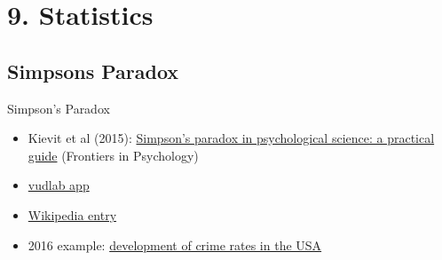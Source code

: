 \documentclass[xcolor=table,       handout,    xcolor=dvipsnames]{beamer}\usepackage[]{graphicx}\usepackage[]{color}
\begin{document}
\section{9. Statistics}

\subsection{Simpsons Paradox}

\begin{frame}{Simpson's Paradox}
\begin{itemize}
\item Kievit et al (2015): \href{http://journal.frontiersin.org/article/10.3389/fpsyg.2013.00513/full}{Simpson's paradox in psychological science: a practical guide} (Frontiers in Psychology)
\item \href{http://vudlab.com/simpsons/}{vudlab app}
\item \href{https://en.wikipedia.org/wiki/Simpson\%27s\_paradox\#Examples}{Wikipedia entry}
\item 2016 example: \href{http://www.nytimes.com/2016/09/28/us/murder-rate-cities.html}{development of crime rates in the USA}
\end{itemize}
\label{simpson}
\end{frame}

\end{document}

